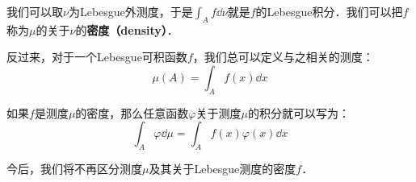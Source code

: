 我们可以取$\nu$为Lebesgue外测度，于是$\int_A f \dd \nu$就是$f$的Lebesgue积分．我们可以把$f$称为$\mu$的关于$\nu$的\textbf{密度（density）}．

反过来，对于一个Lebesgue可积函数$f$，我们总可以定义与之相关的测度：
\begin{equation}
\mu(A) = \int_A f(x) \dd x
\end{equation}

如果$f$是测度$\mu$的密度，那么任意函数$\varphi$关于测度$\mu$的积分就可以写为：
\begin{equation}
\int_A \varphi \dd \mu = \int_A f(x)\varphi(x) \dd x
\end{equation}

今后，我们将不再区分测度$\mu$及其关于Lebesgue测度的密度$f$．












